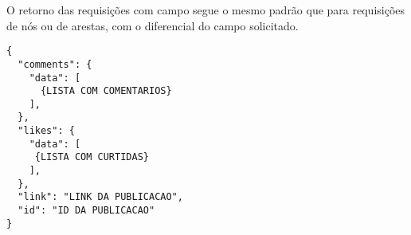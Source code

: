 O retorno das requisições com campo segue o mesmo padrão que para requisições de nós ou de arestas, com o diferencial do campo solicitado.

\begin{lstlisting}[caption={Retorno da requisição \ref{lst:requisicao8} (Campos)}, label={lst:retornoRequisicao8}]
{
  "comments": {
    "data": [
      {LISTA COM COMENTARIOS}
    ],
  },
  "likes": {
    "data": [
     {LISTA COM CURTIDAS}
    ],
  },
  "link": "LINK DA PUBLICACAO",
  "id": "ID DA PUBLICACAO"
}
\end{lstlisting}
